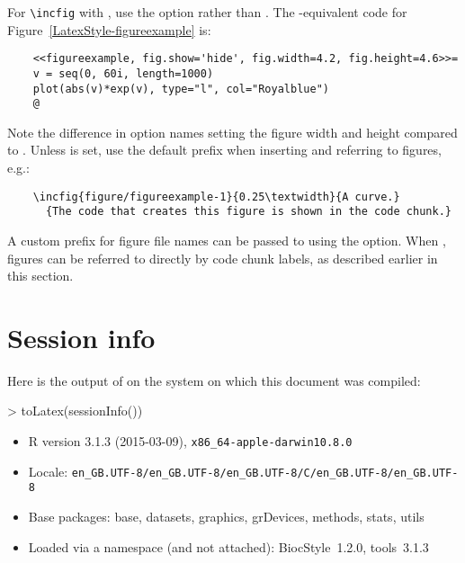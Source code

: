 \documentclass{article}
\begin{document}
For \verb+\incfig+ with , use the option
 rather than . The
-equivalent code for
Figure~\ref{LatexStyle-figureexample} is:
\begin{verbatim}
    <<figureexample, fig.show='hide', fig.width=4.2, fig.height=4.6>>=
    v = seq(0, 60i, length=1000)
    plot(abs(v)*exp(v), type="l", col="Royalblue")
    @
\end{verbatim}
Note the difference in option names setting the figure width and
height compared to .  Unless
 is set, use the default 
prefix when inserting and referring to figures, e.g.:
\begin{verbatim}
    \incfig{figure/figureexample-1}{0.25\textwidth}{A curve.}
      {The code that creates this figure is shown in the code chunk.}
\end{verbatim}
A custom prefix for figure file names can be passed to
 using the  option. When
, figures can be referred to directly by
code chunk labels, as described earlier in this section.


\section{Session info}

Here is the output of  on the system on which
this document was compiled:
\begin{Schunk}
\begin{Sinput}
> toLatex(sessionInfo())
\end{Sinput}
\begin{itemize}\raggedright
  \item R version 3.1.3 (2015-03-09), \verb|x86_64-apple-darwin10.8.0|
  \item Locale: \verb|en_GB.UTF-8/en_GB.UTF-8/en_GB.UTF-8/C/en_GB.UTF-8/en_GB.UTF-8|
  \item Base packages: base, datasets, graphics, grDevices, methods, stats,
    utils
  \item Loaded via a namespace (and not attached): BiocStyle~1.2.0, tools~3.1.3
\end{itemize}\end{Schunk}


\end{document}
